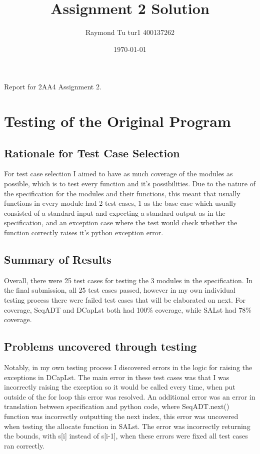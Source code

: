 \documentclass[12pt]{article}
\title{Assignment 2 Solution}
\author{Raymond Tu tur1 400137262}
\date{\today}
\begin{document}
\maketitle

Report for 2AA4 Assignment 2.

\section{Testing of the Original Program}

\subsection{Rationale for Test Case Selection}

For test case selection I aimed to have as much coverage of the modules as possible, which is to test every function and it's possibilities. Due to the nature of the specification for the modules and their functions, this meant that usually functions in every module had 2 test cases, 1 as the base case which usually consisted of a standard input and expecting a standard output as in the specification, and an exception case where the test would check whether the function correctly raises it's python exception error.

\subsection{Summary of Results}

Overall, there were 25 test cases for testing the 3 modules in the specification. In the final submission, all 25 test cases passed, however in my own individual testing process there were failed test cases that will be elaborated on next. For coverage, SeqADT and DCapLst both had 100\% coverage, while SALst had 78\% coverage. 

\subsection{Problems uncovered through testing}

Notably, in my own testing process I discovered errors in the logic for raising the exceptions in DCapLst. The main error in these test cases was that I was incorrectly raising the exception so it would be called every time, when put outside of the for loop this error was resolved. An additional error was an error in translation between specification and python code, where SeqADT.next() function was incorrectly outputting the next index, this error was uncovered when testing the allocate function in SALst. The error was incorrectly returning the bounds, with s[i] instead of s[i-1], when these errors were fixed all test cases ran correctly.
\end{document}
